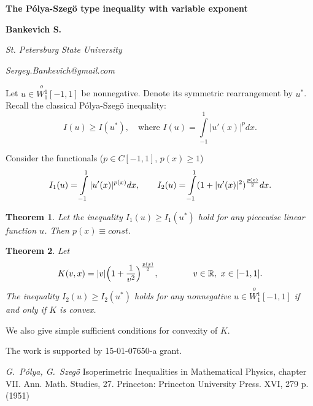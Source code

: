 \documentclass[12pt]{article}
\newtheorem{thm}{Theorem}
\newcommand{\Wf}{\stackrel{o\ }{W{}_1^1}}
\newcommand{\Real}{\mathbb R}
\renewcommand{\ge}{\geqslant}
\begin{document}
\centerline{\large\bf The P\'olya-Szeg\"o type inequality with variable exponent}
\medskip
\centerline{\bf Bankevich S.}
\medskip
\centerline{\it St. Petersburg State University}
\centerline{\it Sergey.Bankevich@gmail.com}
\bigskip

Let $u \in \Wf[-1,1]$ be nonnegative.
Denote its symmetric rearrangement by $u^*$.
Recall the classical P\'olya-Szeg\"o \cite{PS} inequality:
\begin{equation}
\label{ineq}
I(u) \ge I(u^*), \quad \mbox{where } I(u) = \int\limits_{-1}^1 |u'(x)|^p dx.
\end{equation}

Consider the functionals ($p \in C[-1, 1]$, $p(x) \ge 1$)
\begin{equation}
I_1(u) = \int\limits_{-1}^1 |u'(x)|^{p(x)} dx, \qquad
I_2(u) = \int\limits_{-1}^1 ( 1 + |u'(x)|^2 )^{p(x) \over 2} dx.
\end{equation}

\begin{thm}
Let the inequality $I_1(u) \ge I_1(u^*)$ hold for any piecewise linear function $u$.
Then $p(x) \equiv const$.
\end{thm}

\begin{thm}
Let
$$K(v, x) = |v| \Big(1 + {1 \over v^2}\Big)^{p(x) \over 2}, \qquad \qquad v \in \Real,\ x \in [-1, 1].$$
The inequality $I_2(u) \ge I_2(u^*)$ holds for any nonnegative $u \in \Wf[-1, 1]$ if and only if $K$ is convex.
\end{thm}

We also give simple sufficient conditions for convexity of $K$.

The work is supported by 15-01-07650-a grant.

\begin{thebibliography}{100}
 {\it G.~P\'olya, G.~Szeg\"o}
Isoperimetric Inequalities in Mathematical Physics, chapter VII.
Ann. Math. Studies, 27. Princeton: Princeton University Press. XVI, 279 p. (1951)
\end{thebibliography}
\end{document}
